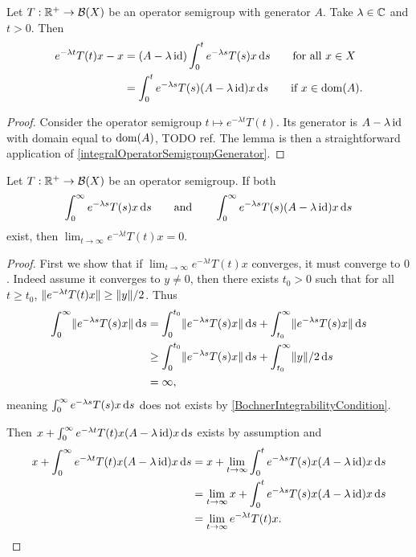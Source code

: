 \begin{lemma} \label{expScaledSemigroupLemma}
Let $T: \mathbb{R}^+\to \operatorname{\mathcal{B}}(X)$ be an operator semigroup with generator $A$. Take $\lambda\in \mathbb{C}$ and $t> 0$. Then
\begin{align*}
e^{-\lambda t}T(t)x - x &= (A- \lambda\operatorname{id})\int_0^t e^{-\lambda s}T(s)x\operatorname{d \!}{s} \qquad\text{for all $x\in X$} \\
&= \int_0^t e^{-\lambda s}T(s)(A-\lambda\operatorname{id})x\operatorname{d \!}{s} \qquad\text{if $x\in\operatorname{dom}(A)$}.
\end{align*}
\end{lemma}
\begin{proof}
Consider the operator semigroup $t\mapsto e^{-\lambda t}T(t)$. Its generator is $A-\lambda\operatorname{id}$ with domain equal to $\operatorname{dom}(A)$, TODO ref. The lemma is then a straightforward application of \ref{integralOperatorSemigroupGenerator}.
\end{proof}
\begin{corollary} \label{limitInftyExpScaledSemigroup}
Let $T: \mathbb{R}^+\to \operatorname{\mathcal{B}}(X)$ be an operator semigroup. If both
\[ \int_0^\infty e^{-\lambda s}T(s)x\operatorname{d \!}{s} \qquad\text{and}\qquad \int_0^{\infty}e^{-\lambda s}T(s)(A-\lambda\operatorname{id})x\operatorname{d \!}{s} \]
exist, then $\lim_{t\to\infty}e^{-\lambda t}T(t)x = 0$.
\end{corollary}
\begin{proof}
First we show that if $\lim_{t\to\infty}e^{-\lambda t}T(t)x$ converges, it must converge to $0$. Indeed assume it converges to $y \neq 0$, then there exists $t_0 > 0$ such that for all $t\geq t_0$, $\lVert e^{-\lambda t}T(t)x\rVert \geq \lVert y\rVert/2$. Thus
\begin{align*}
\int_0^\infty \lVert e^{-\lambda s}T(s)x\rVert\operatorname{d \!}{s} &= \int_0^{t_0}\lVert e^{-\lambda s}T(s)x\rVert\operatorname{d \!}{s} + \int_{t_0}^{\infty}\lVert e^{-\lambda s}T(s)x\rVert\operatorname{d \!}{s} \\
&\geq \int_0^{t_0}\lVert e^{-\lambda s}T(s)x\rVert\operatorname{d \!}{s} + \int_{t_0}^{\infty}\lVert y\rVert/2\operatorname{d \!}{s} \\
&= \infty,
\end{align*}
meaning $\int_0^\infty e^{-\lambda s}T(s)x\operatorname{d \!}{s}$ does not exists by \ref{BochnerIntegrabilityCondition}.

Then $x + \int_0^{\infty}e^{-\lambda t}T(t)x(A-\lambda\operatorname{id})x\operatorname{d \!}{s}$ exists by assumption and
\begin{align*}
x + \int_0^{\infty}e^{-\lambda t}T(t)x(A-\lambda\operatorname{id})x\operatorname{d \!}{s} &= x+\lim_{t\to\infty}\int_0^{t}e^{-\lambda s}T(s)x(A-\lambda\operatorname{id})x\operatorname{d \!}{s} \\
&= \lim_{t\to\infty}x+\int_0^{t}e^{-\lambda s}T(s)x(A-\lambda\operatorname{id})x\operatorname{d \!}{s} \\
&= \lim_{t\to\infty} e^{-\lambda t}T(t)x.
\end{align*}
\end{proof}


